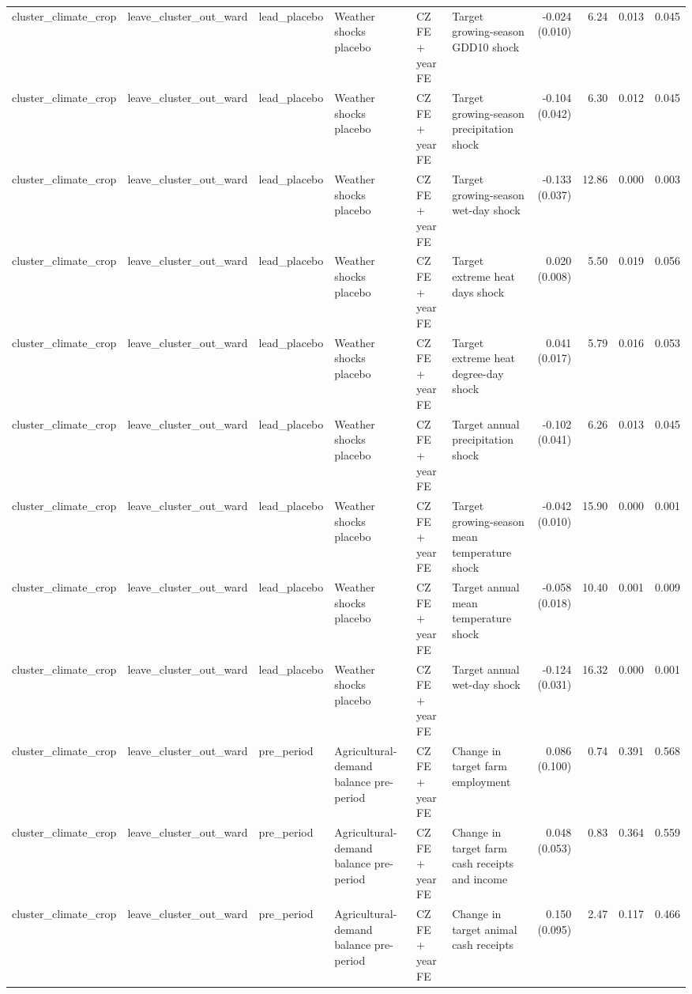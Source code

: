 \begin{tabular}{llllllrrrr}
cluster_climate_crop & leave_cluster_out_ward & lead_placebo & Weather shocks placebo & CZ FE + year FE & Target growing-season GDD10 shock & -0.024 (0.010) & 6.24 & 0.013 & 0.045 \\
cluster_climate_crop & leave_cluster_out_ward & lead_placebo & Weather shocks placebo & CZ FE + year FE & Target growing-season precipitation shock & -0.104 (0.042) & 6.30 & 0.012 & 0.045 \\
cluster_climate_crop & leave_cluster_out_ward & lead_placebo & Weather shocks placebo & CZ FE + year FE & Target growing-season wet-day shock & -0.133 (0.037) & 12.86 & 0.000 & 0.003 \\
cluster_climate_crop & leave_cluster_out_ward & lead_placebo & Weather shocks placebo & CZ FE + year FE & Target extreme heat days shock & 0.020 (0.008) & 5.50 & 0.019 & 0.056 \\
cluster_climate_crop & leave_cluster_out_ward & lead_placebo & Weather shocks placebo & CZ FE + year FE & Target extreme heat degree-day shock & 0.041 (0.017) & 5.79 & 0.016 & 0.053 \\
cluster_climate_crop & leave_cluster_out_ward & lead_placebo & Weather shocks placebo & CZ FE + year FE & Target annual precipitation shock & -0.102 (0.041) & 6.26 & 0.013 & 0.045 \\
cluster_climate_crop & leave_cluster_out_ward & lead_placebo & Weather shocks placebo & CZ FE + year FE & Target growing-season mean temperature shock & -0.042 (0.010) & 15.90 & 0.000 & 0.001 \\
cluster_climate_crop & leave_cluster_out_ward & lead_placebo & Weather shocks placebo & CZ FE + year FE & Target annual mean temperature shock & -0.058 (0.018) & 10.40 & 0.001 & 0.009 \\
cluster_climate_crop & leave_cluster_out_ward & lead_placebo & Weather shocks placebo & CZ FE + year FE & Target annual wet-day shock & -0.124 (0.031) & 16.32 & 0.000 & 0.001 \\
cluster_climate_crop & leave_cluster_out_ward & pre_period & Agricultural-demand balance pre-period & CZ FE + year FE & Change in target farm employment & 0.086 (0.100) & 0.74 & 0.391 & 0.568 \\
cluster_climate_crop & leave_cluster_out_ward & pre_period & Agricultural-demand balance pre-period & CZ FE + year FE & Change in target farm cash receipts and income & 0.048 (0.053) & 0.83 & 0.364 & 0.559 \\
cluster_climate_crop & leave_cluster_out_ward & pre_period & Agricultural-demand balance pre-period & CZ FE + year FE & Change in target animal cash receipts & 0.150 (0.095) & 2.47 & 0.117 & 0.466 \\

\end{tabular}
